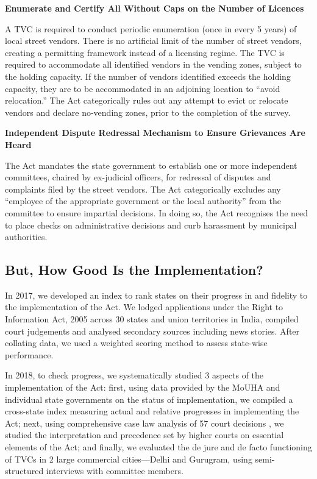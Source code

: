 \documentclass[a4paper, 12pt, twoside]{article}
\begin{document}
{\textbf{Enumerate and Certify All Without Caps on the Number of Licences}

A TVC is required to conduct periodic enumeration (once in every 5 years) of local street vendors. There is no artificial limit of the number of street vendors, creating a permitting framework instead of a licensing regime. The TVC is required to accommodate all identified vendors in the vending zones, subject to the holding capacity.  If the number of vendors identified exceeds the holding capacity, they are to be accommodated in an adjoining location to “avoid relocation.” The Act categorically rules out any attempt to evict or relocate vendors and declare no-vending zones, prior to the completion of the survey.

\textbf{Independent Dispute Redressal Mechanism to Ensure Grievances Are Heard }

The Act mandates the state government to establish one or more independent committees, chaired by ex-judicial officers, for redressal of disputes and complaints filed by the street vendors. The Act categorically excludes any “employee of the appropriate government or the local authority” from the committee to ensure impartial decisions. In doing so, the Act recognises the need to place checks on administrative decisions and curb harassment by municipal authorities.

\subsection*{But, How Good Is the Implementation?}

In 2017, we developed an index to rank states on their progress in and fidelity to the implementation of the Act. We lodged applications under the Right to Information Act, 2005 across 30 states and union territories in India, compiled court judgements and analysed secondary sources including news stories. After collating data, we used a weighted scoring method to assess state-wise performance.

In 2018, to check progress, we systematically studied 3 aspects of the implementation of the Act: first, using data provided by the MoUHA and individual state governments on the status of implementation, we compiled a cross-state index measuring actual and relative progresses in implementing the Act; next, using comprehensive case law analysis of 57 court decisions , we studied the interpretation and precedence set by higher courts on essential elements of the Act; and finally, we evaluated the de jure and de facto functioning of TVCs in 2 large commercial cities—Delhi and Gurugram, using semi-structured interviews with committee members.

}
\end{document}
